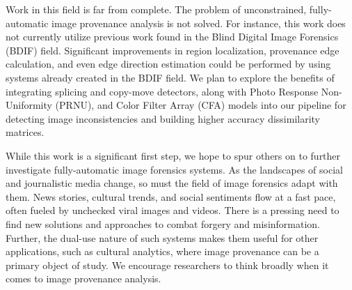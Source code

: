 

Work in this field is far from complete. The problem of unconstrained, fully-automatic image provenance analysis is not solved.  For instance, this work does not currently utilize previous work found in the Blind Digital Image Forensics (BDIF) field. Significant improvements in region localization, provenance edge calculation, and even edge direction estimation could be performed by using systems already created in the BDIF field. We plan to explore the benefits of integrating splicing and copy-move detectors, along with Photo Response Non-Uniformity (PRNU), %
and Color Filter Array (CFA) models into our pipeline for detecting image inconsistencies and building higher accuracy dissimilarity matrices.

While this work is a significant first step, we hope to spur others on to further investigate fully-automatic image forensics systems. As the landscapes of social and journalistic media change, so must the field of image forensics adapt with them. News stories, cultural trends, and social sentiments flow at a fast pace, often fueled by unchecked viral images and videos. There is a pressing need to find new solutions and approaches to combat forgery and misinformation. Further, the dual-use nature of such systems makes them useful for other applications, such as cultural analytics, where image provenance can be a primary object of study. We encourage researchers to think broadly when it comes to image provenance analysis.
